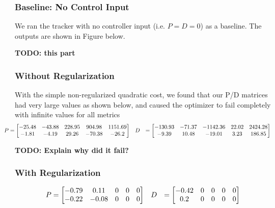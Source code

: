 \documentclass[11pt]{article}
\begin{document}
    \subsubsection{Baseline: No Control Input}
    We ran the tracker with no controller input (i.e. $P = D = 0$) as a baseline. The outputs are shown in Figure  below.
    
    \textbf{TODO: this part}

    \subsubsection{Without Regularization} \label{sec:results:singletraj:noreg}
    With the simple non-regularized quadratic cost, we found that our P/D matrices had very large values as shown below, and caused the optimizer to fail completely with infinite values for all metrics
        \begin{align*}
            \hspace{-2em}
            P &= \bmat{-25.48 & -43.88 & 228.95 & 904.98 & 1151.69 \\
                -1.81 & -4.19 & 29.26 & -70.38 & -26.2} && 
            D &
            = \bmat{-130.93 & -71.37 & -1142.36 & 22.02 & 2424.28 \\
                -9.39 & 10.48  & -19.01 & 3.23 & 186.85}
        \end{align*}
    
    \textbf{TODO: Explain why did it fail?}
    
    \subsubsection{With Regularization} \label{sec:results:singletraj:wreg}
        \begin{align*}
            P &= \begin{bmatrix}-0.79 & 0.11 & 0 & 0 & 0 \\ -0.22 & -0.08 & 0 & 0 & 0\end{bmatrix} && 
            D &= \begin{bmatrix}-0.42 & 0 & 0 & 0 & 0 \\  0.2 & 0 & 0 & 0 & 0\end{bmatrix}
        \end{align*}
    
\end{document}
